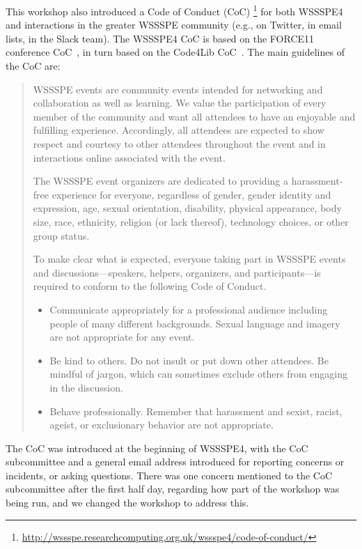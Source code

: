 \documentclass[11pt, oneside]{amsart}
\begin{document}
This workshop also introduced a Code of Conduct (CoC)
\footnote{\url{http://wssspe.researchcomputing.org.uk/wssspe4/code-of-conduct/}}
for both WSSSPE4 and interactions in the greater WSSSPE community (e.g., on
Twitter, in email lists, in the Slack team). The WSSSPE4 CoC is based on the
FORCE11 conference CoC~\cite{FORCE11:CoC}, in turn based on the Code4Lib
CoC~\cite{Code4Lib:CoC}.
The main guidelines of the CoC are:
\begin{quote}
    WSSSPE events are community events intended for networking and collaboration
    as well as learning. We value the participation of every member of the
    community and want all attendees to have an enjoyable and fulfilling
    experience. Accordingly, all attendees are expected to show respect and
    courtesy to other attendees throughout the event and in interactions online
    associated with the event.

    The WSSSPE event organizers are dedicated to providing a harassment-free
    experience for everyone, regardless of gender, gender identity and
    expression, age, sexual orientation, disability, physical appearance,
    body size, race, ethnicity, religion (or lack thereof), technology choices,
    or other group status.

    To make clear what is expected, everyone taking part in WSSSPE events and
    discussions---speakers, helpers, organizers, and participants---is required
    to conform to the following Code of Conduct.

    \begin{itemize}
    \item Communicate appropriately for a professional audience including
    people of many different backgrounds. Sexual language and imagery are not
    appropriate for any event.

    \item Be kind to others. Do not insult or put down other attendees. Be
    mindful of jargon, which can sometimes exclude others from engaging in the
    discussion.

    \item Behave professionally. Remember that harassment and sexist, racist,
    ageist, or exclusionary behavior are not appropriate.
    \end{itemize}
\end{quote}

The CoC was introduced at the beginning of WSSSPE4, with the CoC subcommittee
and a general email address introduced for reporting concerns or incidents, or
asking questions.  There was one concern mentioned to the CoC subcommittee
after the first half day,
regarding how part of the workshop was being run, and we changed the workshop
to address this.
\end{document}
